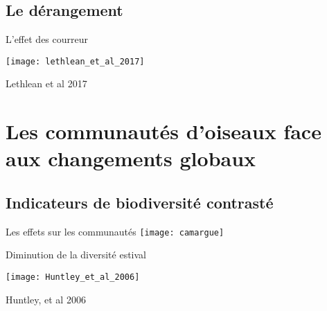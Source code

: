 \documentclass[10pt]{beamer}
\begin{document}
\subsection{Le dérangement}

\begin{frame}{L'effet des courreur}

       \begin{center}
     \texttt{[image: lethlean\_et\_al\_2017]}
   
      \end{center}
       \begin{tiny}
      \vspace{10pt}
        Lethlean et al 2017

  \end{tiny}
 \end{frame}

 \section[Les effets sur les communautés]{Les communautés d'oiseaux face aux changements globaux}


\subsection{Indicateurs de biodiversité contrasté}

\begin{frame} {Les effets sur les communautés}
 \texttt{[image: camargue]}
\end{frame}


\begin{frame}{Diminution de la diversité estival}
  \begin{center}
   \texttt{[image: Huntley\_et\_al\_2006]}
  \end{center}
  \begin{tiny}
   Huntley, et al 2006
  \end{tiny}

\end{frame}
\end{document}
